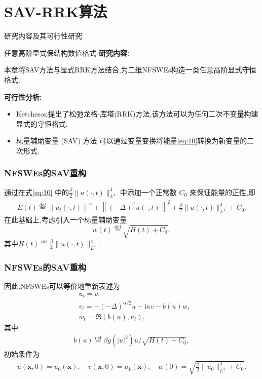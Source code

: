 \documentclass[aspectratio=169]{beamer}
\numberwithin{theorem}{section} %
\numberwithin{equation}{section}%
\numberwithin{figure}{section}%
\numberwithin{table}{section}%
\begin{document}
\section{SAV-RRK算法}
\begin{frame}{研究内容及其可行性研究}
	\begin{block}{任意高阶显式保结构数值格式}
		\textbf{\textcolor[rgb]{0.227,0.373,0.306}{研究内容:}}
		
		{\footnotesize 本章将SAV方法与显式RRK方法结合,为二维NFSWEs构造一类任意高阶显式守恒格式.}
		
		\textbf{\textcolor[rgb]{0.227,0.373,0.306}{可行性分析:}}
		\begin{itemize}
			\item {\footnotesize Ketcheson\cite{ketchesonRelaxationRungeKutta2019}提出了松弛龙格-库塔(RRK)方法,该方法可以为任何二次不变量构建显式的守恒格式.}%
			\item {\footnotesize 标量辅助变量 (SAV) 方法 \cite{chengConvergenceEnergyconservingScheme2022} 可以通过变量变换将能量\eqref{eq:10}转换为新变量的二次形式.}%
			\end{itemize}
	\end{block}
	\end{frame}
	
\begin{frame}\frametitle{NFSWEs的SAV重构}
	通过在式\eqref{eq:10} 中的$\frac{\beta}{2}\|u(\cdot, t)\|_{L^{4}}^{4}$ 中添加一个正常数 $C_0$ 来保证能量的正性,即
	\begin{align}\label{eq_SAVRRK:9_1}
		E(t)\overset{\text{def}}{=}\left\|u_{t}(\cdot, t)\right\|^{2}+\left\|(-\Delta)^{\frac{\alpha}{4}} u(\cdot, t)\right\|^{2}+\frac{\beta}{2}\|u(\cdot, t)\|_{L^{4}}^{4} + C_0.
	\end{align}
	在此基础上,考虑引入一个标量辅助变量
	\begin{equation}
		w(t)\overset{\text{def}}{=}\sqrt{H(t)+C_0},
	\end{equation}
	其中$H(t)\overset{\text{def}}{=}\frac{\beta}{2}\|u(\cdot, t)\|_{L^{4}}^{4} .$
\end{frame}

\begin{frame}\frametitle{NFSWEs的SAV重构}
因此,NFSWEs可以等价地重新表述为
{\color{purple}\begin{align}
& u_t=v, \label{eq_SAVRRK:2-2}\\
& v_t=-(-\Delta)^{\alpha / 2} u-\mathrm{i}\kappa v-b(u) w, \label{eq_SAVRRK:2-3}\\
& w_t=\Re\left(b(u), u_t\right),\label{eq_SAVRRK:2-4}
\end{align}}
其中
\begin{align}
b(u)\overset{\text{def}}{=}\beta g(|u|^2) u / \sqrt{H(t)+C_0},
\end{align}
初始条件为
\begin{align}\label{eq_SAVRRK:31}
	u(\boldsymbol{x}, 0)=u_{0}(\boldsymbol{x}), \quad v(\boldsymbol{x}, 0)=u_{1}(\boldsymbol{x}), \quad w(0)=\sqrt{\frac{\beta}{2}\|u_{0}\|_{L^{4}}^{4} +C_0}.
\end{align}
\end{frame}
\end{document}
